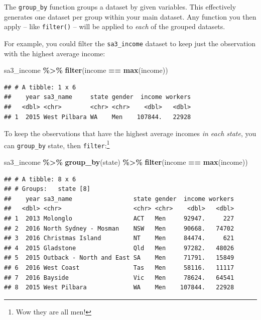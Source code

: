 \documentclass[
]{book}
\newenvironment{Shaded}{\begin{snugshade}}{\end{snugshade}}
\newcommand{\KeywordTok}[1]{\textcolor[rgb]{0.13,0.29,0.53}{\textbf{#1}}}
\newcommand{\NormalTok}[1]{#1}
\newcommand{\OperatorTok}[1]{\textcolor[rgb]{0.81,0.36,0.00}{\textbf{#1}}}
\newcommand{\StringTok}[1]{\textcolor[rgb]{0.31,0.60,0.02}{#1}}
\begin{document}
The \texttt{group\_by} function groups a dataset by given variables. This effectively generates one dataset per group within your main dataset. Any function you then apply -- like \texttt{filter()} -- will be applied to \emph{each} of the grouped datasets.

For example, you could filter the \texttt{sa3\_income} dataset to keep just the observation with the highest average income:

\begin{Shaded}
\begin{Highlighting}[]
\NormalTok{sa3\_income }\OperatorTok{\%\textgreater{}\%}\StringTok{ }
\StringTok{  }\KeywordTok{filter}\NormalTok{(income }\OperatorTok{==}\StringTok{ }\KeywordTok{max}\NormalTok{(income))}
\end{Highlighting}
\end{Shaded}

\begin{verbatim}
## # A tibble: 1 x 6
##    year sa3_name     state gender  income workers
##   <dbl> <chr>        <chr> <chr>    <dbl>   <dbl>
## 1  2015 West Pilbara WA    Men    107844.   22928
\end{verbatim}

To keep the observations that have the highest average incomes \emph{in each state}, you can \texttt{group\_by} state, then \texttt{filter}:\footnote{Wow they are all men!}

\begin{Shaded}
\begin{Highlighting}[]
\NormalTok{sa3\_income }\OperatorTok{\%\textgreater{}\%}\StringTok{ }
\StringTok{  }\KeywordTok{group\_by}\NormalTok{(state) }\OperatorTok{\%\textgreater{}\%}\StringTok{ }
\StringTok{  }\KeywordTok{filter}\NormalTok{(income }\OperatorTok{==}\StringTok{ }\KeywordTok{max}\NormalTok{(income))}
\end{Highlighting}
\end{Shaded}

\begin{verbatim}
## # A tibble: 8 x 6
## # Groups:   state [8]
##    year sa3_name                 state gender  income workers
##   <dbl> <chr>                    <chr> <chr>    <dbl>   <dbl>
## 1  2013 Molonglo                 ACT   Men     92947.     227
## 2  2016 North Sydney - Mosman    NSW   Men     90668.   74702
## 3  2016 Christmas Island         NT    Men     84474.     621
## 4  2015 Gladstone                Qld   Men     97282.   48026
## 5  2015 Outback - North and East SA    Men     71791.   15849
## 6  2016 West Coast               Tas   Men     58116.   11117
## 7  2016 Bayside                  Vic   Men     78624.   64541
## 8  2015 West Pilbara             WA    Men    107844.   22928
\end{verbatim}
\end{document}
